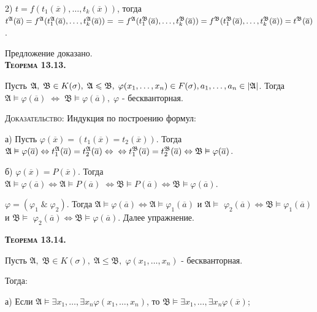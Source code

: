 \documentclass[18pt, a4paper]{extarticle}
\newcommand{\ampersand}{\;\&\;}
\begin{document}
2) $t=f(t_1(\overline{x}),\dots,t_k(\overline{x}))$, тогда $t^{\mathfrak{A}}(\overline{a})=f^{\mathfrak{A}}(t^{\mathfrak{A}}_1(\overline{a}),\dots,t^{\mathfrak{A}}_k(\overline{a}))=\newline =f^{\mathfrak{A}}(t^{\mathfrak{B}}_1(\overline{a}),\dots,t^{\mathfrak{B}}_k(\overline{a}))=f^{\mathfrak{B}}(t^{\mathfrak{B}}_1(\overline{a}),\dots,t^{\mathfrak{B}}_k(\overline{a}))=t^{\mathfrak{B}}(\overline{a})$.

Предложение доказано.\\

\textbf{\textsc{Теорема 13.13.}} 

Пусть $\mathfrak{A},\;\mathfrak{B}\in K(\sigma),\;\mathfrak{A}\leqslant\mathfrak{B},\;\varphi(x_1,\dots,x_n)\in F(\sigma),\newline a_1,\dots,a_n\in|\mathfrak{A}|$. Тогда $\mathfrak{A}\vDash\varphi(\overline{a})\;\Leftrightarrow\;\mathfrak{B}\vDash\varphi(\overline{a}),\;\varphi$ -  бескванторная.

\textsc{Доказательство:}  Индукция по построению формул:

а) Пусть $\varphi(\overline{x})=(t_1(\overline{x})=t_2(\overline{x}))$. Тогда $\mathfrak{A}\vDash\varphi(\overline{a})\Leftrightarrow t_1^{\mathfrak{A}}(\overline{a})=t_2^{\mathfrak{A}}(\overline{a})\Leftrightarrow\newline\Leftrightarrow t_1^{\mathfrak{B}}(\overline{a})=t_2^{\mathfrak{B}}(\overline{a})\Leftrightarrow\mathfrak{B}\vDash\varphi(\overline{a})$.

б) $\varphi(\overline{x})=P(\overline{x})$. Тогда $\mathfrak{A}\vDash\varphi(\overline{a})\Leftrightarrow\mathfrak{A}\vDash P(\overline{a})\;\Leftrightarrow\mathfrak{B}\vDash P(\overline{a})\Leftrightarrow\mathfrak{B}\vDash\varphi(\overline{a})$.

$\varphi=(\varphi_1\ampersand\varphi_2)$. Тогда $\mathfrak{A}\vDash\varphi(\overline{a})\Leftrightarrow\mathfrak{A}\vDash\varphi_1(\overline{a})$ и $\mathfrak{A}\vDash$ $\varphi_2(\overline{a})\Leftrightarrow\mathfrak{B}\vDash\varphi_1(\overline{a})$ и $\mathfrak{B}\vDash$ $\varphi_2(\overline{a})\Leftrightarrow\mathfrak{B}\vDash\varphi(\overline{a})$. Далее упражнение.

\textbf{\textsc{Теорема 13.14.}} 

Пусть $\mathfrak{A},\;\mathfrak{B}\in K(\sigma),\;\mathfrak{A}\leqslant\mathfrak{B},\;\varphi(x_1,\dots,x_n)$ -  бескванторная.

Тогда:

а) Если $\mathfrak{A}\vDash\exists x_1,\dots,\exists x_n\varphi(x_1,\dots,x_n)$, то $\mathfrak{B}\vDash\exists x_1,\dots,\exists x_n\varphi(\overline{x})$;
\end{document}
